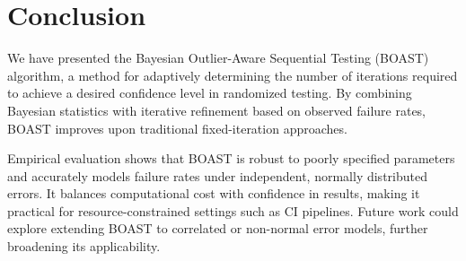 \section{Conclusion}

We have presented the Bayesian Outlier-Aware Sequential Testing (BOAST) algorithm, a method for adaptively determining the number of iterations required to achieve a desired confidence level in randomized testing. By combining Bayesian statistics with iterative refinement based on observed failure rates, BOAST improves upon traditional fixed-iteration approaches.

Empirical evaluation shows that BOAST is robust to poorly specified parameters and accurately models failure rates under independent, normally distributed errors. It balances computational cost with confidence in results, making it practical for resource-constrained settings such as CI pipelines. Future work could explore extending BOAST to correlated or non-normal error models, further broadening its applicability.


